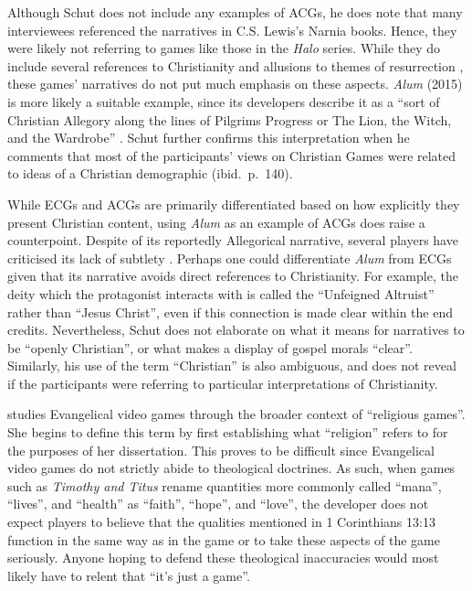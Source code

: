 Although Schut does not include any examples of \acp{ACG}, he does note that many interviewees referenced the narratives in C.S. Lewis's Narnia books. Hence, they were likely not referring to games like those in the \textit{Halo} series. While they do include several references to Christianity and allusions to themes of resurrection \parencite{paulissen_dark_2018}, these games' narratives do not put much emphasis on these aspects. \textit{Alum} (2015) is more likely a suitable example, since its developers describe it as a ``sort of Christian Allegory along the lines of Pilgrims Progress or The Lion, the Witch, and the Wardrobe'' \parencite{crashable_studios_alum_2015}. Schut further confirms this interpretation when he comments that most of the participants' views on Christian Games were related to ideas of a Christian demographic (ibid.~p.~140).

While \acp{ECG} and \acp{ACG} are primarily differentiated based on how explicitly they present Christian content, using \textit{Alum} as an example of \acp{ACG} does raise a counterpoint. Despite of its reportedly Allegorical narrative, several players have criticised its lack of subtlety \parencite {arkane_review_2015, baxted_review_2015, virotti_review_2017}. Perhaps one could differentiate \textit{Alum} from \acp{ECG} given that its narrative avoids direct references to Christianity. For example, the deity which the protagonist interacts with is called the ``Unfeigned Altruist'' rather than ``Jesus Christ'', even if this connection is made clear within the end credits. Nevertheless, Schut does not elaborate on what it means for narratives to be ``openly Christian'', or what makes a display of gospel morals ``clear''. Similarly, his use of the term ``Christian'' is also ambiguous, and does not reveal if the participants were referring to particular interpretations of Christianity.

\textcite{gonzalez_born-again_2014} studies Evangelical video games through the broader context of ``religious games''. She begins to define this term by first establishing what ``religion'' refers to for the purposes of her dissertation. This proves to be difficult since Evangelical video games do not strictly abide to theological doctrines. As such, when games such as \textit{Timothy and Titus} rename quantities more commonly called ``mana'', ``lives'', and ``health'' as ``faith'', ``hope'', and ``love'', the developer does not expect players to believe that the qualities mentioned in 1 Corinthians 13:13 function in the same way as in the game or to take these aspects of the game seriously. Anyone hoping to defend these theological inaccuracies would most likely have to relent that ``it's just a game''.

